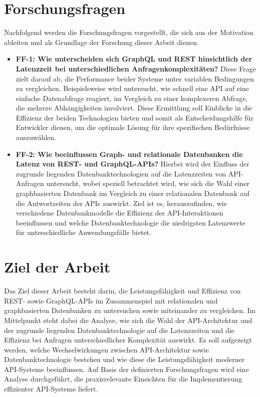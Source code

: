 \section{Forschungsfragen} %
\label{sec:forschungsfragen}
Nachfolgend werden die Forschungsfragen vorgestellt, die sich aus der Motivation ableiten und als Grundlage der Forschung dieser Arbeit dienen.
\begin{itemize}
	\item \textbf{FF-1: Wie unterscheiden sich GraphQL und REST hinsichtlich der Latenzzeit bei unterschiedlichen Anfragenkomplexitäten?}  Diese Frage zielt darauf ab, die Performance beider Systeme unter variablen Bedingungen zu vergleichen. Beispielsweise wird untersucht, wie schnell eine API auf eine einfache Datenabfrage reagiert, im Vergleich zu einer komplexeren Abfrage, die mehrere Abhängigkeiten involviert. Diese Ermittlung soll Einblicke in die Effizienz der beiden Technologien bieten und somit als Entscheidungshilfe für Entwickler dienen, um die optimale Lösung für ihre spezifischen Bedürfnisse auszuwählen.
	\item \textbf{FF-2: Wie beeinflussen Graph- und relationale Datenbanken die Latenz von REST- und GraphQL-APIs?} Hierbei wird der Einfluss der zugrunde liegenden Datenbanktechnologien auf die Latenzzeiten von API-Anfragen untersucht, wobei speziell betrachtet wird, wie sich die Wahl einer graphbasierten Datenbank im Vergleich zu einer relationalen Datenbank auf die Antwortzeiten der APIs auswirkt. Ziel ist es, herauszufinden, wie verschiedene Datenbankmodelle die Effizienz der API-Interaktionen beeinflussen und welche Datenbanktechnologie die niedrigsten Latenzwerte für unterschiedliche Anwendungsfälle bietet.
\end{itemize} 
\section{Ziel der Arbeit} %
\label{sec:zielderarbeit}
Das Ziel dieser Arbeit besteht darin, die Leistungsfähigkeit und Effizienz von REST- sowie GraphQL-APIs im Zusammenspiel mit relationalen und graphbasierten Datenbanken zu untersuchen sowie miteinander zu vergleichen. Im Mittelpunkt steht dabei die Analyse, wie sich die Wahl der API-Architektur und der zugrunde liegenden Datenbanktechnologie auf die Latenzzeiten und die Effizienz bei Anfragen unterschiedlicher Komplexität auswirkt. Es soll aufgezeigt werden, welche Wechselwirkungen zwischen API-Architektur sowie Datenbanktechnologie bestehen und wie diese die Leistungsfähigkeit moderner API-Systeme beeinflussen. Auf Basis der definierten Forschungsfragen wird eine Analyse durchgeführt, die praxisrelevante Einsichten für die Implementierung effizienter API-Systeme liefert.
\newpage
